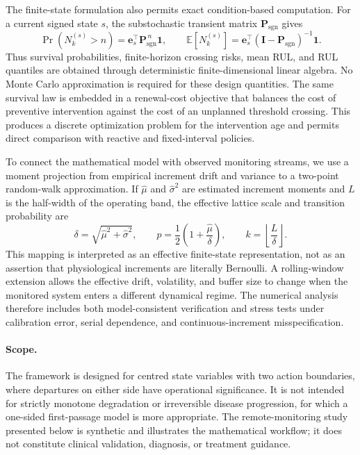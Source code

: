 \documentclass[pdflatex,sn-mathphys-num]{sn-jnl}
\theoremstyle{definition}
\newcommand{\E}{\mathbb{E}}
\numberwithin{equation}{section}
\begin{document}
The finite-state formulation also permits exact condition-based computation.
For a current signed state \(s\), the substochastic transient matrix
\(\mathbf P_{\mathrm{sgn}}\) gives
\[
\Pr\!\left(N_k^{(s)}>n\right)
=
\mathbf e_s^{\top}\mathbf P_{\mathrm{sgn}}^{\,n}\mathbf 1,
\qquad
\E\!\left[N_k^{(s)}\right]
=
\mathbf e_s^{\top}
(\mathbf I-\mathbf P_{\mathrm{sgn}})^{-1}\mathbf 1.
\]
Thus survival probabilities, finite-horizon crossing risks, mean RUL, and RUL
quantiles are obtained through deterministic finite-dimensional linear
algebra. No Monte Carlo approximation is required for these design quantities.
The same survival law is embedded in a renewal-cost objective that balances the
cost of preventive intervention against the cost of an unplanned threshold
crossing. This produces a discrete optimization problem for the intervention
age and permits direct comparison with reactive and fixed-interval policies.

To connect the mathematical model with observed monitoring streams, we use a
moment projection from empirical increment drift and variance to a two-point
random-walk approximation. If \(\hat\mu\) and \(\hat\sigma^2\) are estimated
increment moments and \(L\) is the half-width of the operating band, the
effective lattice scale and transition probability are
\[
\delta=\sqrt{\hat\mu^2+\hat\sigma^2},
\qquad
p=\frac12\left(1+\frac{\hat\mu}{\delta}\right),
\qquad
k=\left\lfloor\frac{L}{\delta}\right\rfloor.
\]
This mapping is interpreted as an effective finite-state representation, not
as an assertion that physiological increments are literally Bernoulli.
A rolling-window extension allows the effective drift, volatility, and buffer
size to change when the monitored system enters a different dynamical regime.
The numerical analysis therefore includes both model-consistent verification
and stress tests under calibration error, serial dependence, and
continuous-increment misspecification.

\paragraph{Scope.}
The framework is designed for centred state variables with two action
boundaries, where departures on either side have operational significance. It
is not intended for strictly monotone degradation or irreversible disease
progression, for which a one-sided first-passage model is more appropriate.
The remote-monitoring study presented below is synthetic and illustrates the
mathematical workflow; it does not constitute clinical validation, diagnosis,
or treatment guidance.
\end{document}
